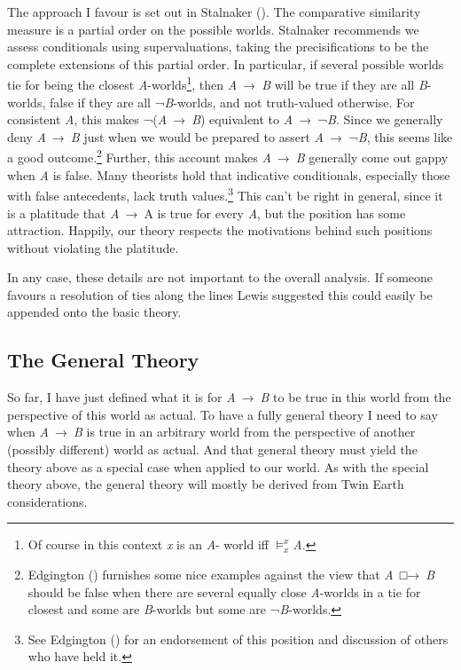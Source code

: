 \documentclass[
  11pt,
  letterpaper,
  DIV=11,
  numbers=noendperiod,
  twoside]{scrartcl}
\begin{document}
The approach I favour is set out in Stalnaker
(). The comparative similarity measure
is a partial order on the possible worlds. Stalnaker recommends we
assess conditionals using supervaluations, taking the precisifications
to be the complete extensions of this partial order. In particular, if
several possible worlds tie for being the closest
\emph{A}-worlds\footnote{Of course in this context \emph{x} is an
  \emph{A}- world iff \(\vDash_x^x\)\emph{A}.}, then \emph{A}~→~\emph{B}
will be true if they are all \emph{B}-worlds, false if they are all
¬\emph{B}-worlds, and not truth-valued otherwise. For consistent
\emph{A}, this makes ¬(\emph{A}~→~\emph{B}) equivalent to
\emph{A}~→~¬\emph{B}. Since we generally deny \emph{A}~→~\emph{B} just
when we would be prepared to assert \emph{A}~→~¬\emph{B}, this seems
like a good outcome.\footnote{Edgington
  () furnishes some nice examples
  against the view that \emph{A}~□→~\emph{B} should be false when there
  are several equally close \emph{A}-worlds in a tie for closest and
  some are \emph{B}-worlds but some are ¬\emph{B}-worlds.} Further, this
account makes \emph{A}~→~\emph{B} generally come out gappy when \emph{A}
is false. Many theorists hold that indicative conditionals, especially
those with false antecedents, lack truth values.\footnote{See Edgington
  () for an endorsement of this
  position and discussion of others who have held it.} This can't be
right in general, since it is a platitude that \emph{A}~→~A is true for
every \emph{A}, but the position has some attraction. Happily, our
theory respects the motivations behind such positions without violating
the platitude.

In any case, these details are not important to the overall analysis. If
someone favours a resolution of ties along the lines Lewis suggested
this could easily be appended onto the basic theory.

\subsection{The General Theory}\label{the-general-theory}

So far, I have just defined what it is for \emph{A}~→~\emph{B} to be
true in this world from the perspective of this world as actual. To have
a fully general theory I need to say when \emph{A}~→~\emph{B} is true in
an arbitrary world from the perspective of another (possibly different)
world as actual. And that general theory must yield the theory above as
a special case when applied to our world. As with the special theory
above, the general theory will mostly be derived from Twin Earth
considerations.
\end{document}
